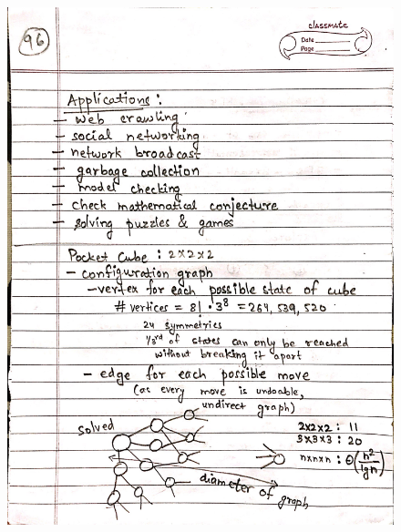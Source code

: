 \begin{figure}[H]
    \centering
    \includegraphics[scale=0.25]{"./MIT 6.006/MIT_6006_096"}
\end{figure}
\newpage
